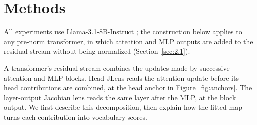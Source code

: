\documentclass[11pt,a4paper]{article}
\begin{document}
\section{Methods}\label{sec:2}

All experiments use Llama-3.1-8B-Instruct \citep{grattafiori2024}; the construction below applies to any pre-norm transformer, in which attention and MLP outputs are added to the residual stream without being normalized (Section~\ref{sec:2.1}).

A transformer's residual stream combines the updates made by successive attention and MLP blocks. Head-JLens reads the attention update before its head contributions are combined, at the head anchor in Figure~\ref{fig:anchors}. The layer-output Jacobian lens reads the same layer after the MLP, at the block output. We first describe this decomposition, then explain how the fitted map turns each contribution into vocabulary scores.
\end{document}
